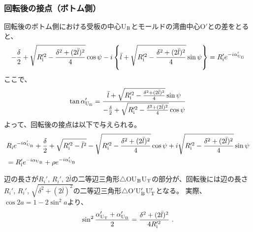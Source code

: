 \subsubsection{回転後の接点（ボトム側）}
回転後のボトム側における受板の中心U$_\text B$とモールドの湾曲中心O$'$との差をとると、
\begin{align*}
  -\frac\delta2+\sqrt{R_\text i'^2-\frac{\delta^2+(2\bar l)^2}4}\cos\psi
  -i\left\{\bar l+\sqrt{R_\text i'^2-\frac{\delta^2+(2\bar l)^2}4}\sin\psi\right\}
  = R_\text i'e^{-i\alpha'_{\text U_\text B}}
\end{align*}
ここで、
\begin{align*}
  \tan\alpha'_{\text U_\text B}
  = \frac{\bar l+\sqrt{R_\text i'^2-\frac{\delta^2+(2\bar l)^2}4}\sin\psi}
         {-\frac\delta2+\sqrt{R_\text i'^2-\frac{\delta^2+(2\bar l)^2}4}\cos\psi}
\end{align*}
よって、回転後の接点は以下で与えられる。
\begin{align}
  \notag
  &  R_\text ie^{-i\alpha'_{\text U_\text B}}
     +\frac\delta2+\sqrt{R_\text i'^2-\bar l^2}-\sqrt{R_\text i'^2-\frac{\delta^2+(2\bar l)^2}4}\cos\psi
     +i\sqrt{R_\text i'^2-\frac{\delta^2+(2\bar l)^2}4}\sin\psi\\
  &= R_\text i'e^{-i\alpha_{\text U_\text B}}+\rho e^{-i\alpha'_{\text U_\text B}}
   \label{eq:afterUBcontact}
\end{align}
\begin{hosokubox}
辺の長さが$R_i'$, $R_i'$, $2\bar l$の二等辺三角形$\triangle$OU$_\text B$U$_\text T$の部分が、回転後には辺の長さ$R_i'$, $R_i'$, $\sqrt{\delta^2+(2\bar l)^2}$の二等辺三角形$\triangle$O$'$U$_\text B'$U$_\text T'$となる。
実際、$\cos2a = 1-2\sin^2\!a$より、
\begin{align*}
  \sin^2\frac{\alpha'_{\text U_\text T}+\alpha'_{\text U_\text B}}2
  = \frac{\delta^2+(2\bar l)^2}{4R_\text i'^2}\ .
\end{align*}
\end{hosokubox}



